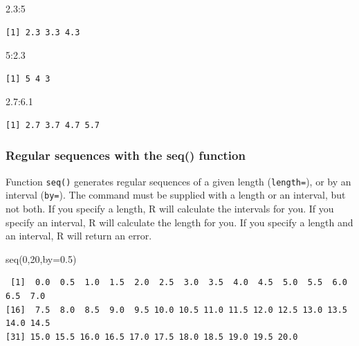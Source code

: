 \documentclass[
  13,
  letterpaper,
]{report}
\newenvironment{Shaded}{\begin{snugshade}}{\end{snugshade}}
\newcommand{\AttributeTok}[1]{\textcolor[rgb]{0.40,0.45,0.13}{#1}}
\newcommand{\DecValTok}[1]{\textcolor[rgb]{0.68,0.00,0.00}{#1}}
\newcommand{\FloatTok}[1]{\textcolor[rgb]{0.68,0.00,0.00}{#1}}
\newcommand{\FunctionTok}[1]{\textcolor[rgb]{0.28,0.35,0.67}{#1}}
\newcommand{\NormalTok}[1]{\textcolor[rgb]{0.00,0.23,0.31}{#1}}
\newcommand{\SpecialCharTok}[1]{\textcolor[rgb]{0.37,0.37,0.37}{#1}}
\begin{document}
\begin{Shaded}
\begin{Highlighting}[]
\FloatTok{2.3}\SpecialCharTok{:}\DecValTok{5}
\end{Highlighting}
\end{Shaded}

\begin{verbatim}
[1] 2.3 3.3 4.3
\end{verbatim}

\begin{Shaded}
\begin{Highlighting}[]
\DecValTok{5}\SpecialCharTok{:}\FloatTok{2.3}
\end{Highlighting}
\end{Shaded}

\begin{verbatim}
[1] 5 4 3
\end{verbatim}

\begin{Shaded}
\begin{Highlighting}[]
\FloatTok{2.7}\SpecialCharTok{:}\FloatTok{6.1}
\end{Highlighting}
\end{Shaded}

\begin{verbatim}
[1] 2.7 3.7 4.7 5.7
\end{verbatim}

\subsubsection{Regular sequences with the seq()
function}\label{sec-manip-make-seq-seq}

Function \texttt{seq()} generates regular sequences of a given length
(\texttt{length=}), or by an interval (\texttt{by=}). The command must
be supplied with a length or an interval, but not both. If you specify a
length, R will calculate the intervals for you. If you specify an
interval, R will calculate the length for you. If you specify a length
and an interval, R will return an error.

\begin{Shaded}
\begin{Highlighting}[]
\FunctionTok{seq}\NormalTok{(}\DecValTok{0}\NormalTok{,}\DecValTok{20}\NormalTok{,}\AttributeTok{by=}\FloatTok{0.5}\NormalTok{)}
\end{Highlighting}
\end{Shaded}

\begin{verbatim}
 [1]  0.0  0.5  1.0  1.5  2.0  2.5  3.0  3.5  4.0  4.5  5.0  5.5  6.0  6.5  7.0
[16]  7.5  8.0  8.5  9.0  9.5 10.0 10.5 11.0 11.5 12.0 12.5 13.0 13.5 14.0 14.5
[31] 15.0 15.5 16.0 16.5 17.0 17.5 18.0 18.5 19.0 19.5 20.0
\end{verbatim}
\end{document}
